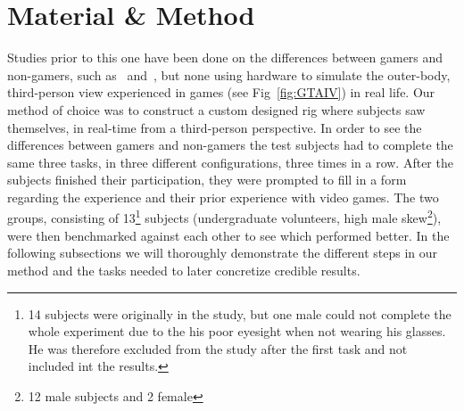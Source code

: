 \documentclass[runningheads,a4paper,oribibl]{llncs}
\begin{document}

\section{Material \& Method}
Studies prior to this one have been done on the differences between gamers and non-gamers, such as~\cite{schmierbach2011exploring} and~\cite{gong2015enhanced}, but none using hardware to simulate the outer-body, third-person view experienced in games (see Fig~\ref{fig:GTAIV}) in real life. Our method of choice was to construct a custom designed rig where subjects saw themselves, in real-time from a third-person perspective. In order to see the differences between gamers and non-gamers the test subjects had to complete the same three tasks, in three different configurations, three times in a row. After the subjects finished their participation, they were prompted to fill in a form regarding the experience and their prior experience with video games. The two groups, consisting of 13\footnote{14 subjects were originally in the study, but one male could not complete the whole experiment due to the his poor eyesight when not wearing his glasses. He was therefore excluded from the study after the first task and not included int the results.} subjects (undergraduate volunteers, high male skew\footnote{12 male subjects and 2 female}), were then benchmarked against each other to see which performed better. In the following subsections we will thoroughly demonstrate the different steps in our method and the tasks needed to later concretize credible results.
\end{document}

